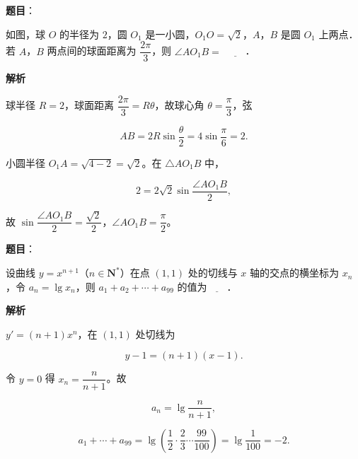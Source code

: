 \begin{answer}

\textbf{题目}：

如图，球 $O$ 的半径为 $2$，圆 $O_1$ 是一小圆，$O_1O=\sqrt2$，$A$，$B$ 是圆 $O_1$ 上两点．若 $A$，$B$ 两点间的球面距离为 $\dfrac{2\pi}3$，则 $\angle AO_1B=$ $\underline{\qquad}$．
\nopagebreak[4]
\begin{center}\end{center}
\nopagebreak[4]
\textbf{解析}

球半径 $R=2$，球面距离 $\dfrac{2\pi}3=R\theta$，故球心角 $\theta=\dfrac\pi3$，弦

\nopagebreak[4]
\[AB=2R\sin\frac\theta2=4\sin\frac\pi6=2.\]

小圆半径 $O_1A=\sqrt{4-2}=\sqrt2$。在 $\triangle AO_1B$ 中，

\nopagebreak[4]
\[2=2\sqrt2\sin\frac{\angle AO_1B}2,\]

故 $\sin\dfrac{\angle AO_1B}2=\dfrac{\sqrt2}2$，$\angle AO_1B=\dfrac\pi2$。


\end{answer}
\begin{answer}

\textbf{题目}：

设曲线 $y=x^{n+1}$（$n\in\mathbf N^*$）在点 $(1,1)$ 处的切线与 $x$ 轴的交点的横坐标为 $x_n$，令 $a_n=\lg x_n$，则 $a_1+a_2+\cdots+a_{99}$ 的值为$\underline{\qquad}$．

\textbf{解析}

$y'=(n+1)x^n$，在 $(1,1)$ 处切线为

\nopagebreak[4]
\[y-1=(n+1)(x-1).\]

令 $y=0$ 得 $x_n=\dfrac n{n+1}$。故

\nopagebreak[4]
\[a_n=\lg\frac n{n+1},\]

\nopagebreak[4]
\[a_1+\cdots+a_{99}
=\lg\left(\frac12\cdot\frac23\cdots\frac{99}{100}\right)
=\lg\frac1{100}=-2.\]


\end{answer}
